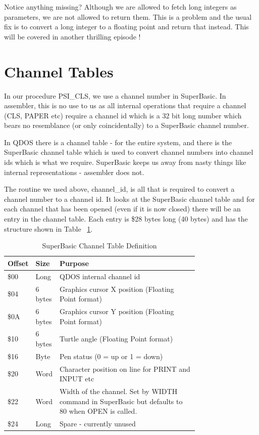 Notice anything missing? Although we are allowed to fetch long
    integers as parameters, we are not allowed to return them. This is a
    problem and the usual fix is to convert a long integer to a floating point
    and return that instead. This will be covered in another thrilling episode
   !

\section{Channel Tables}
\label{ch7-channel-table}%

In our procedure PSI\_CLS, we use a channel number in SuperBasic. In
    assembler, this is no use to us as all internal operations that require a
    channel (CLS, PAPER etc) require a channel id which is a 32 bit long
    number which bears no resemblance (or only coincidentally) to a SuperBasic
    channel number.

In QDOS there is a channel table -{} for the entire system, and there
    is the SuperBasic channel table which is used to convert channel numbers
    into channel ids which is what we require. SuperBasic keeps us away from
    nasty things like internal representations -{} assembler does not.

The routine we used above, channel\_id, is all that is required to
    convert a channel number to a channel id. It looks at the SuperBasic
    channel table and for each channel that has been opened (even if it is now
    closed) there will be an entry in the channel table. Each entry is \$28
    bytes long (40 bytes) and has the structure shown in Table ~\ref{tab:SuperBasicChannelTableDefinition}.

\begin{table}[htbp]
\centering
\begin{tabular}{l l p{0.75\linewidth}}  %
\toprule
\textbf{Offset} & \textbf{Size} & \textbf{Purpose} \\
\midrule
%
\$00 & Long    & QDOS internal channel id\\
\$04 & 6 bytes & Graphics cursor X position (Floating Point format)\\
\$0A & 6 bytes & Graphics cursor Y position (Floating Point format)\\
\$10 & 6 bytes & Turtle angle (Floating Point format)\\
\$16 & Byte    & Pen status (0 = up or 1 = down)\\
\$20 & Word    & Character position on line for PRINT and INPUT etc\\
\$22 & Word    & Width of the channel. Set by WIDTH command in SuperBasic but defaults to 80 when OPEN is called.\\
\$24 & Long    & Spare -{} currently unused\\
%
\bottomrule
\end{tabular}
\caption{SuperBasic Channel Table Definition}
\label{tab:SuperBasicChannelTableDefinition}
\end{table}


